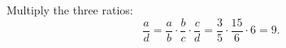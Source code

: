 Multiply the three ratios:
\[\dfrac ad=\dfrac ab\cdot\dfrac bc\cdot\dfrac cd=\dfrac35\cdot\dfrac{15}{6}\cdot6=\boxed{9}.\]
